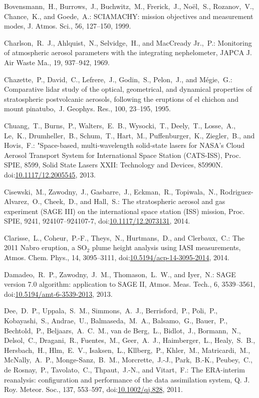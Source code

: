 \documentclass[amtd, online, hvmath]{copernicus}
\begin{document}
\begin{thebibliography}{99}
Bovensmann,~H., Burrows,~J., Buchwitz,~M., Frerick,~J., No\"{e}l,~S.,
Rozanov,~V., Chance,~K., and Goede,~A.: SCIAMACHY: mission objectives and
measurement modes, J. Atmos. Sci., 56, 127--150, 1999.


Charlson,~R.~J., Ahlquist,~N., Selvidge,~H., and MacCready Jr.,~P.:
Monitoring of atmospheric aerosol parameters with the integrating
nephelometer, JAPCA J. Air Waste Ma., 19, 937--942, 1969.


Chazette,~P., David,~C., Lefrere,~J., Godin,~S., Pelon,~J., and
M\'{e}gie,~G.: Comparative lidar study of the optical, geometrical, and
dynamical properties of stratospheric postvolcanic aerosols, following the
eruptions of el chichon and mount pinatubo,~J. Geophys. Res., 100, 23--195,
1995.

Chuang,~T., Burns,~P., Walters,~E.~B., Wysocki,~T., Deely,~T., Losse,~A., Le,~K.,
Drumheller,~B., Schum,~T., Hart,~M., Puffenburger,~K., Ziegler,~B., and Hovis,~F.:
"Space-based, multi-wavelength solid-state lasers for NASA's Cloud Aerosol Transport
System for International Space Station (CATS-ISS), Proc. SPIE, 8599, Solid State Lasers XXII:
Technology and Devices, 85990N. doi:\href{http://dx.doi.org/10.1117/12.2005545}{10.1117/12.2005545}, 2013.

Cisewski,~M., Zawodny,~J., Gasbarre,~J., Eckman,~R., Topiwala,~N.,
Rodriguez-Alvarez,~O., Cheek,~D., and Hall,~S.: The stratospheric aerosol and
gas experiment (SAGE III) on the international space station (ISS) mission,
Proc. SPIE, 9241, 924107--924107-7,
doi:\href{http://dx.doi.org/10.1117/12.2073131}{10.1117/12.2073131}, 2014.


Clarisse,~L., Coheur,~P.-F., Theys,~N., Hurtmans,~D., and Clerbaux,~C.: The
2011 Nabro eruption, a SO$_{2}$ plume height analysis using IASI
measurements, Atmos. Chem. Phys., 14, 3095--3111,
doi:\href{http://dx.doi.org/10.5194/acp-14-3095-2014}{10.5194/acp-14-3095-2014},
2014.



Damadeo,~R.~P., Zawodny,~J.~M., Thomason,~L.~W., and Iyer,~N.: SAGE version
7.0 algorithm: application to SAGE II, Atmos. Meas. Tech., 6, 3539--3561,
doi:\href{http://dx.doi.org/10.5194/amt-6-3539-2013}{10.5194/amt-6-3539-2013},
2013.



Dee,~D.~P., Uppala,~S.~M., Simmons,~A.~J., Berrisford,~P., Poli,~P.,
Kobayashi,~S., Andrae,~U., Balmaseda,~M.~A., Balsamo,~G., Bauer,~P.,
Bechtold,~P., Beljaars,~A.~C.~M., van de Berg,~L., Bidlot,~J., Bormann,~N.,
Delsol,~C., Dragani,~R., Fuentes,~M., Geer,~A.~J., Haimberger,~L.,
Healy,~S.~B., Hersbach,~H., Hlm,~E.~V., Isaksen,~L., Kllberg,~P., Khler,~M.,
Matricardi,~M., McNally,~A.~P., Monge-Sanz,~B.~M., Morcrette,~J.-J.,
Park,~B.-K., Peubey,~C., de Rosnay,~P., Tavolato,~C., Thpaut,~J.-N., and
Vitart,~F.: The ERA-interim reanalysis: configuration and performance of the
data assimilation system, Q. J. Roy. Meteor. Soc., 137, 553--597,
doi:\href{http://dx.doi.org/10.1002/qj.828}{10.1002/qj.828}, 2011.



\end{thebibliography}
\end{document}
